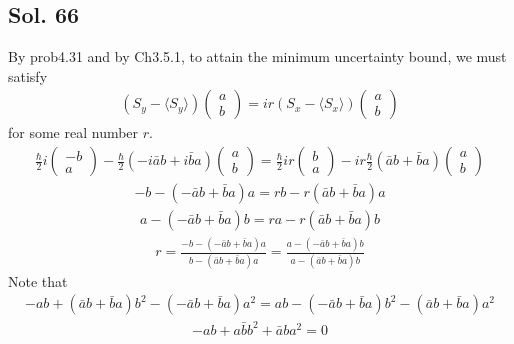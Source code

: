 \subsection*{Sol. 66}
By prob4.31 and by Ch3.5.1, to attain the minimum uncertainty bound, we must satisfy
\begin{align*}
    (S_y-\langle S_y\rangle)\begin{pmatrix}
        a \\ b
    \end{pmatrix}
    =ir
    (S_x-\langle S_x\rangle)\begin{pmatrix}
        a \\ b
    \end{pmatrix}
\end{align*}
for some real number $r.$
\begin{align*}
    \frac{\hbar}{2}i\begin{pmatrix}
        -b \\ a
    \end{pmatrix}
    -\frac{\hbar}{2}(-i\bar ab+i\bar ba)\begin{pmatrix}
        a\\b
    \end{pmatrix}
    =\frac{\hbar}{2}ir\begin{pmatrix}
        b\\a
    \end{pmatrix}
    -ir\frac{\hbar}{2}
    (\bar ab+\bar ba)
    \begin{pmatrix}
        a\\b
    \end{pmatrix}
\end{align*}
\begin{align*}
    -b-(-\bar ab + \bar ba)a = rb - r(\bar a b + \bar b a)a
\end{align*}
\begin{align*}
    a-(-\bar ab + \bar ba)b = ra - r(\bar a b + \bar b a)b
\end{align*}
\begin{align*}
    r = \frac{-b -(-\bar ab+\bar ba )a}{b-(\bar ab +\bar ba)a}
    =\frac{a-(-\bar a b + \bar ba)b}{a-(\bar a b + \bar ba)b}
\end{align*}
Note that 
\begin{align*}
    -ab + (\bar ab+\bar ba)b^2 - (-\bar ab+\bar ba)a^2 = ab
    -(-\bar ab+\bar ba)b^2 - (\bar ab + \bar ba)a^2
\end{align*}
\begin{align*}
    -ab + a\bar bb^2 +\bar a ba^2 = 0
\end{align*}
